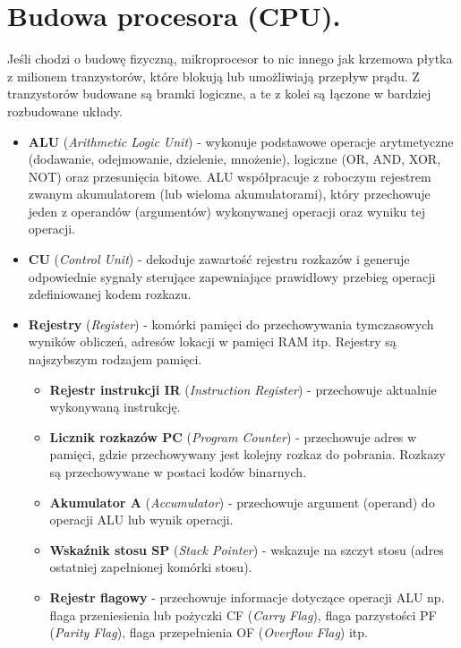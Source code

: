 \documentclass[12pt,a4paper]{article}
\begin{document}
	\section{Budowa procesora (CPU).}
	Jeśli chodzi o budowę fizyczną, mikroprocesor to nic innego jak krzemowa płytka z milionem tranzystorów, które blokują lub umożliwiają przepływ prądu. Z tranzystorów budowane są bramki logiczne, a te z kolei są łączone w bardziej rozbudowane układy.
	
	\begin{itemize}
		\item \textbf{ALU} (\textit{Arithmetic Logic Unit}) - wykonuje podstawowe operacje arytmetyczne (dodawanie, odejmowanie, dzielenie, mnożenie), logiczne (OR, AND, XOR, NOT) oraz przesunięcia bitowe. ALU współpracuje z roboczym rejestrem zwanym akumulatorem (lub wieloma akumulatorami), który przechowuje jeden z operandów (argumentów) wykonywanej operacji oraz wyniku tej operacji.
		
		\item \textbf{CU} (\textit{Control Unit}) - dekoduje zawartość rejestru rozkazów i generuje odpowiednie sygnały sterujące zapewniające prawidłowy przebieg operacji zdefiniowanej kodem rozkazu.
		
		\item \textbf{Rejestry} (\textit{Register}) - komórki pamięci do przechowywania tymczasowych wyników obliczeń, adresów lokacji w pamięci RAM itp. Rejestry są najszybszym rodzajem pamięci.
		\begin{itemize}
			\item \textbf{Rejestr instrukcji IR} (\textit{Instruction Register}) - przechowuje aktualnie wykonywaną instrukcję.
			\item \textbf{Licznik rozkazów PC} (\textit{Program Counter}) - przechowuje adres w pamięci, gdzie przechowywany jest kolejny rozkaz do pobrania. Rozkazy są przechowywane w postaci kodów binarnych.
			\item \textbf{Akumulator A} (\textit{Accumulator}) - przechowuje argument (operand) do operacji ALU lub wynik operacji.
			\item \textbf{Wskaźnik stosu SP} (\textit{Stack Pointer}) - wskazuje na szczyt stosu (adres ostatniej zapełnionej komórki stosu).
			\item \textbf{Rejestr flagowy} - przechowuje informacje dotyczące operacji ALU np. flaga przeniesienia lub pożyczki CF (\textit{Carry Flag}), flaga parzystości PF (\textit{Parity Flag}), flaga przepełnienia OF (\textit{Overflow Flag}) itp.
		\end{itemize}
		

\end{itemize}
\end{document}

